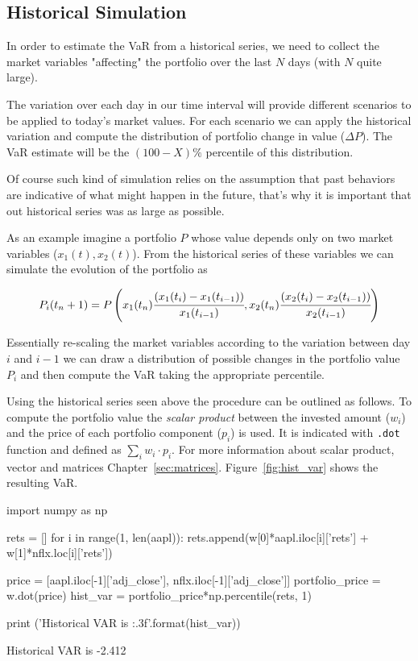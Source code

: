 \subsection{Historical Simulation}
\label{historical-simulation}

In order to estimate the VaR from a historical series, we need to collect the market variables "affecting" the portfolio over the last $N$ days (with $N$ quite large).

The variation over each day in our time interval will provide different scenarios to be applied to today's market values. For each scenario we can apply the historical variation and compute the distribution of portfolio change in value (\(\Delta P\)). The VaR estimate will be the $(100 - X)\%$ percentile of this distribution. 

Of course such kind of simulation relies on the assumption that past behaviors are indicative of what might happen in the future, that's why it is important that out historical series was as large as possible.

As an example imagine a portfolio $P$ whose value depends only on two market variables (\(x_1(t), x_2(t)\)). From the historical series of these variables we can simulate the evolution of the portfolio as

\begin{equation}
P_i(t_n+1) = P\left(x_1(t_n)\cfrac{(x_1(t_i)-x_1(t_{i-1}))}{x_1(t_{i-1})}, x_2(t_n)\cfrac{(x_2(t_i)-x_2(t_{i-1}))}{x_2(t_{i-1})}\right)
\end{equation}

Essentially re-scaling the market variables according to the variation between day \(i\) and \(i-1\) we can draw a distribution of possible changes in the portfolio value \(P_i\) and then compute the VaR taking the appropriate percentile.

Using the historical series seen above the procedure can be outlined as follows. To compute the portfolio value the \emph{scalar product} between the invested amount ($w_i$) and the price of each portfolio component ($p_i$) is used. It is indicated with \texttt{.dot} function and defined as $\sum_{i} w_i \cdot p_i$. For more information about scalar product, vector and matrices Chapter~\ref{sec:matrices}. Figure~\ref{fig:hist_var} shows the resulting VaR. 

\begin{ipython}
import numpy as np

rets = []
for i in range(1, len(aapl)):
    rets.append(w[0]*aapl.iloc[i]['rets'] + w[1]*nflx.loc[i]['rets'])

price = [aapl.iloc[-1]['adj_close'], nflx.iloc[-1]['adj_close']]
portfolio_price = w.dot(price)
hist_var = portfolio_price*np.percentile(rets, 1)

print ('Historical VAR is {:.3f}'.format(hist_var))
\end{ipython}
\begin{ioutput}
Historical VAR is -2.412
\end{ioutput}

